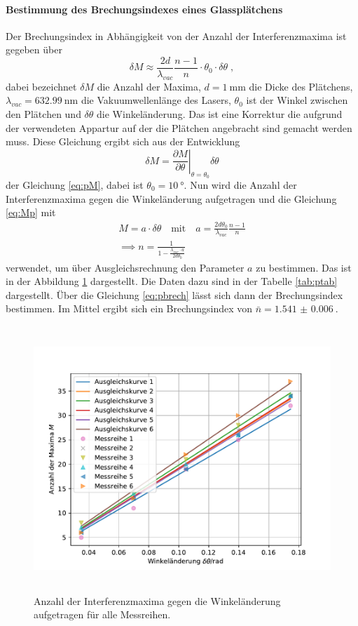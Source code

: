 \FloatBarrier

\paragraph{Bestimmung des Brechungsindexes eines Glassplätchens}
Der Brechungsindex in Abhängigkeit von der Anzahl der Interferenzmaxima ist gegeben über
\begin{equation}
\delta M \approx \frac{2d}{\lambda_{vac}} \frac{n-1}{n} \cdot \theta_0 \cdot \delta \theta \;,
\label{eq:Mp}
\end{equation}
dabei bezeichnet $\delta M$ die Anzahl der Maxima, $d = \SI{1}{\milli\meter}$ 
die Dicke des Plätchens, $\lambda_{vac}=\SI{632.99}{\nano\meter}$ 
die Vakuumwellenlänge des Lasers, $\theta_0$ ist der Winkel zwischen 
den Plätchen und $\delta \theta$ die Winkeländerung. Das ist eine Korrektur die aufgrund der 
verwendeten Appartur auf der die Plätchen angebracht sind gemacht werden muss. 
Diese Gleichung ergibt sich aus der Entwicklung 
\begin{equation*}
\delta M = \left.\frac{\partial M}{\partial \theta} \right\rvert_{\theta = \theta_0 } \delta \theta
\end{equation*}
der Gleichung \eqref{eq:pM}, dabei ist $\theta_0 = \SI{10}{\degree}$.
Nun wird die Anzahl der Interferenzmaxima gegen die Winkeländerung aufgetragen und die Gleichung 
\eqref{eq:Mp} mit 
\begin{gather}
M = a \cdot \delta\theta \quad \text{mit} \quad a =\frac{2d \theta_0}{\lambda_{vac}} \frac{n-1}{n}
\label{eq:pfit} \\
\implies n = \frac{1}{1-\frac{\lambda_{vac} \cdot a}{2d \theta_0}} 
\label{eq:pbrech}
\end{gather}
verwendet, um über Ausgleichsrechnung den Parameter $a$ zu bestimmen. Das ist in der Abbildung 
\ref{fig:pfit} dargestellt. Die Daten dazu sind in der Tabelle \ref{tab:ptab} dargestellt.
Über die Gleichung \eqref{eq:pbrech} lässt sich dann der Brechungsindex bestimmen. Im Mittel 
ergibt sich ein Brechungsindex von $\bar{n} = \SI{1.541(6)}{}$. 
\begin{figure}
  \centering
  \includegraphics[height = 10cm]{plots/Plaettchenplot.pdf}
  \caption{Anzahl der Interferenzmaxima gegen die Winkeländerung aufgetragen für alle Messreihen.}
  \label{fig:pfit}
\end{figure}
